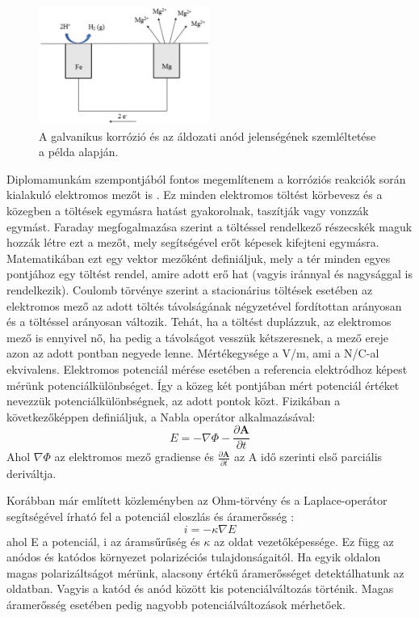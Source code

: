 \begin{figure}
\centering
\includegraphics[width=0.5\textwidth]{img/corrosion.eps}
\caption{A galvanikus korrózió és az áldozati anód jelenségének szemléltetése a példa alapján.}
\label{fig:corrosion}
\end{figure}

Diplomamunkám szempontjából fontos megemlítenem a korróziós reakciók során kialakuló elektromos mezőt is \cite{morley1994principles}. Ez minden elektromos töltést körbevesz és a közegben a töltések egymásra hatást gyakorolnak, taszítják vagy vonzzák egymást. Faraday megfogalmazása szerint a töltéssel rendelkező részecskék maguk hozzák létre ezt a mezőt, mely segítségével erőt képesek kifejteni egymásra. Matematikában ezt egy vektor mezőként definiáljuk, mely a tér minden egyes pontjához egy töltést rendel, amire adott erő hat (vagyis iránnyal és nagysággal is rendelkezik)\cite{purcell2013electricity}. Coulomb törvénye szerint a stacionárius töltések esetében az elektromos mező az adott töltés távolságának négyzetével fordítottan arányosan és a töltéssel arányosan változik. Tehát, ha a töltést duplázzuk, az elektromos mező is ennyivel nő, ha pedig a távolságot vesszük kétszeresnek, a mező ereje azon az adott pontban negyede lenne. Mértékegysége a V/m, ami a N/C-al ekvivalens.   Elektromos potenciál mérése esetében a referencia elektródhoz képest mérünk potenciálkülönbséget. Így a közeg két pontjában mért potenciál értéket nevezzük potenciálkülönbségnek, az adott pontok közt. Fizikában a következőképpen definiáljuk, a Nabla operátor alkalmazásával:
\begin{equation}
{E} = - \nabla \Phi - \frac{ \partial \mathbf{A} }{ \partial t}
\label{fig:field}
\end{equation}
Ahol $\nabla \Phi$ az elektromos mező gradiense és $\frac{ \partial \mathbf{A} }{ \partial t }$ az A idő szerinti első parciális deriváltja.

Korábban már említett közleményben az Ohm-törvény és a Laplace-operátor segítségével írható fel a potenciál eloszlás és áramerősség \cite{isaacs1981scanning}:
\begin{equation}
{i} = - \kappa \nabla E
\label{fig:nabla}
\end{equation}
ahol E a potenciál, i az áramsűrűség és $\kappa$ az oldat vezetőképessége. Ez függ az anódos és katódos környezet polarizéciós tulajdonságaitól. Ha egyik oldalon magas polarizáltságot mérünk, alacsony értékű áramerősséget detektálhatunk az oldatban. Vagyis a katód és anód között kis potenciálváltozás történik. Magas áramerősség esetében pedig nagyobb potenciálváltozások mérhetőek.

